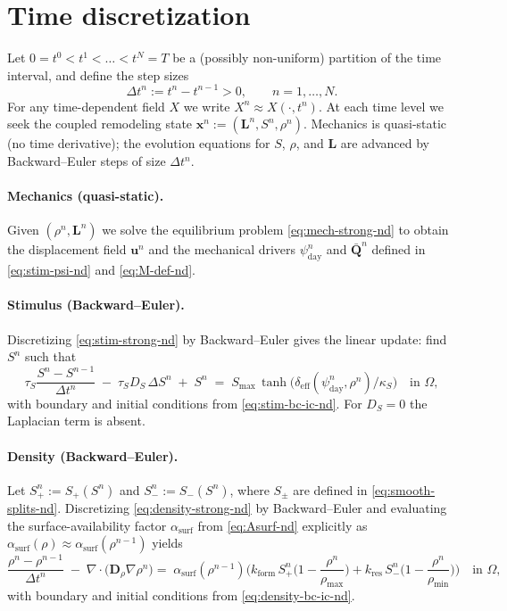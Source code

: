\section*{Time discretization}
\label{sec:be-time}

Let $0=t^0<t^1<\dots<t^N=T$ be a (possibly non-uniform) partition of the time interval, and define the step sizes
\[
\Delta t^n := t^{n}-t^{n-1}>0,\qquad n=1,\dots,N.
\]
For any time-dependent field $X$ we write $X^n \approx X(\cdot,t^n)$.
At each time level we seek the coupled remodeling state $\mathbf{x}^n:=(\mathbf{L}^n,S^n,\rho^n)$.
Mechanics is quasi-static (no time derivative); the evolution equations for $S$, $\rho$, and $\mathbf{L}$ are advanced by Backward--Euler steps of size $\Delta t^n$.

\paragraph{Mechanics (quasi-static).}
Given $(\rho^n,\mathbf{L}^n)$ we solve the equilibrium problem \eqref{eq:mech-strong-nd} to obtain the displacement field $\mathbf{u}^n$ and the mechanical drivers $\psi_{\mathrm{day}}^n$ and $\bar{\mathbf{Q}}^n$ defined in \eqref{eq:stim-psi-nd} and \eqref{eq:M-def-nd}.

\paragraph{Stimulus (Backward--Euler).}
Discretizing \eqref{eq:stim-strong-nd} by Backward--Euler gives the linear update: find $S^n$ such that
\begin{equation}\label{eq:be-stim}
\tau_S\frac{S^{n}-S^{n-1}}{\Delta t^n}\;-\;\tau_S D_S\,\Delta S^{n}\;+\;S^{n}
\;=\; S_{\max}\,\tanh\!\Big(\delta_{\mathrm{eff}}(\psi_{\mathrm{day}}^{n},\rho^{n})/\kappa_S\Big)\quad\text{in }\Omega,
\end{equation}
with boundary and initial conditions from \eqref{eq:stim-bc-ic-nd}. For $D_S=0$ the Laplacian term is absent.

\paragraph{Density (Backward--Euler).}
Let $S_+^n:=S_+(S^n)$ and $S_-^n:=S_-(S^n)$, where $S_\pm$ are defined in \eqref{eq:smooth-splits-nd}. Discretizing \eqref{eq:density-strong-nd} by Backward--Euler and evaluating the surface-availability factor $\alpha_{\mathrm{surf}}$ from \eqref{eq:Asurf-nd} explicitly as $\alpha_{\mathrm{surf}}(\rho)\approx \alpha_{\mathrm{surf}}(\rho^{n-1})$ yields
\begin{equation}\label{eq:be-rho}
\frac{\rho^{n}-\rho^{n-1}}{\Delta t^n}\;-\;\nabla\!\cdot\!\big(\mathbf{D}_\rho\nabla\rho^{n}\big)
=\;\alpha_{\mathrm{surf}}(\rho^{n-1})\Big(
k_{\mathrm{form}}\,S_+^{n}\Big(1-\frac{\rho^{n}}{\rho_{\max}}\Big)
+k_{\mathrm{res}}\,S_-^{n}\Big(1-\frac{\rho^{n}}{\rho_{\min}}\Big)
\Big)\quad\text{in }\Omega,
\end{equation}
with boundary and initial conditions from \eqref{eq:density-bc-ic-nd}.

